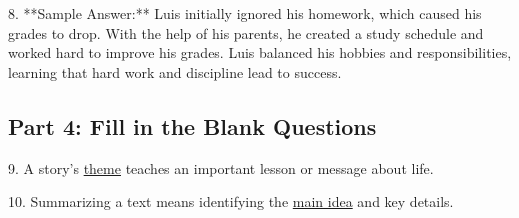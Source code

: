 \documentclass[12pt]{article}
\begin{document}
8. **Sample Answer:** Luis initially ignored his homework, which caused his grades to drop. With the help of his parents, he created a study schedule and worked hard to improve his grades. Luis balanced his hobbies and responsibilities, learning that hard work and discipline lead to success.  

\subsection*{Part 4: Fill in the Blank Questions}

9. A story’s \underline{theme} teaches an important lesson or message about life.

10. Summarizing a text means identifying the \underline{main idea} and key details.
\end{document}
